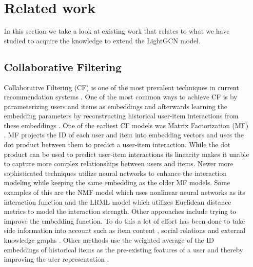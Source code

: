 \section{Related work}\label{sec:related-work}
In this section we take a look at existing work that relates to what we have studied to acquire the knowledge to extend the LightGCN model.

\subsection{Collaborative Filtering}
Collaborative Filtering (CF) is one of the most prevalent techniques in current recommendation systems \cite{YT_rec,NGCF_2019,Pint_rec,COL_MEM_NET}.
One of the most common ways to achieve CF is by parameterizing users and items as embeddings and afterwards learning the embedding parameters by reconstructing historical user-item interactions from these embeddings \cite{NGCF_2019}.
One of the earliest CF models was Matrix Factorization (MF) \cite{Matrix-factorization-techniques, BAY_PER_RAN}.
MF  projects the ID of each user and item into embedding vectors and uses the dot product between them to predict a user-item interaction.
While the dot product can be used to predict user-item interactions its linearity makes it unable to capture more complex relationships between users and items.
Newer more sophisticated techniques utilize neural networks to enhance the interaction modeling while keeping the same embedding as the older MF models.
Some examples of this are the NMF model \cite{NEU_COL_FIL} which uses nonlinear neural networks as its interaction function and the LRML model \cite{LAT_REL_MET} which utilizes Euclidean distance metrics to model the interaction strength.
Other approaches include trying to improve the embedding function.
To do this a lot of effort has been done to take side information into account such as item content \cite{ATT_COL_FIL_MUL}, social relations \cite{REC_SOC_USE} and external knowledge graphs \cite{KGAT, KNO_GRA_REC}.
Other methods use the weighted average of the ID embeddings of historical items as the pre-existing features of a user and thereby improving the user representation \cite{SVD_PLUSPLUS,FISM}.


